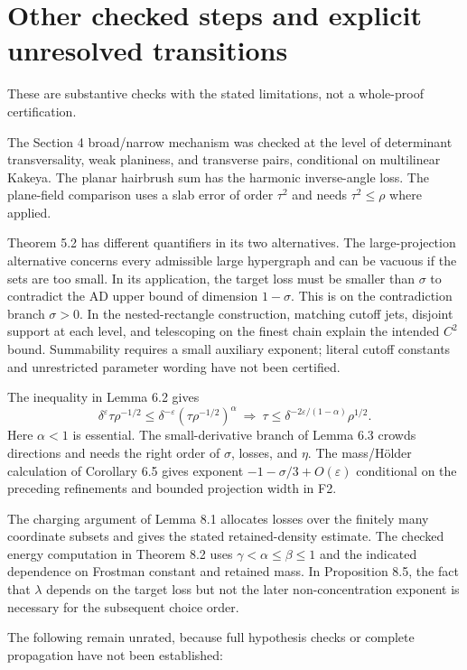 \documentclass[10pt]{article}
\begin{document}
\section*{Other checked steps and explicit unresolved transitions}
These are substantive checks with the stated limitations, not a whole-proof certification.\par
The Section 4 broad/narrow mechanism was checked at the level of determinant transversality, weak planiness, and transverse pairs, conditional on multilinear Kakeya. The planar hairbrush sum has the harmonic inverse-angle loss. The plane-field comparison uses a slab error of order \(\tau^2\) and needs \(\tau^2\le\rho\) where applied.\par
Theorem 5.2 has different quantifiers in its two alternatives. The large-projection alternative concerns every admissible large hypergraph and can be vacuous if the sets are too small. In its application, the target loss must be smaller than \(\sigma\) to contradict the AD upper bound of dimension \(1-\sigma\). This is on the contradiction branch \(\sigma>0\). In the nested-rectangle construction, matching cutoff jets, disjoint support at each level, and telescoping on the finest chain explain the intended \(C^2\) bound. Summability requires a small auxiliary exponent; literal cutoff constants and unrestricted parameter wording have not been certified.\par
The inequality in Lemma 6.2 gives \[\delta^\varepsilon\tau\rho^{-1/2}
 \le\delta^{-\varepsilon}(\tau\rho^{-1/2})^\alpha
 \ \Longrightarrow\
 \tau\le\delta^{-2\varepsilon/(1-\alpha)}\rho^{1/2}.\] Here \(\alpha<1\) is essential. The small-derivative branch of Lemma 6.3 crowds directions and needs the right order of \(\sigma\), losses, and \(\eta\). The mass/Hölder calculation of Corollary 6.5 gives exponent \(-1-\sigma/3+O(\varepsilon)\) conditional on the preceding refinements and bounded projection width in F2.\par
The charging argument of Lemma 8.1 allocates losses over the finitely many coordinate subsets and gives the stated retained-density estimate. The checked energy computation in Theorem 8.2 uses \(\gamma<\alpha\le\beta\le1\) and the indicated dependence on Frostman constant and retained mass. In Proposition 8.5, the fact that \(\lambda\) depends on the target loss but not the later non-concentration exponent is necessary for the subsequent choice order.\par
The following remain unrated, because full hypothesis checks or complete propagation have not been established:\par
\end{document}

